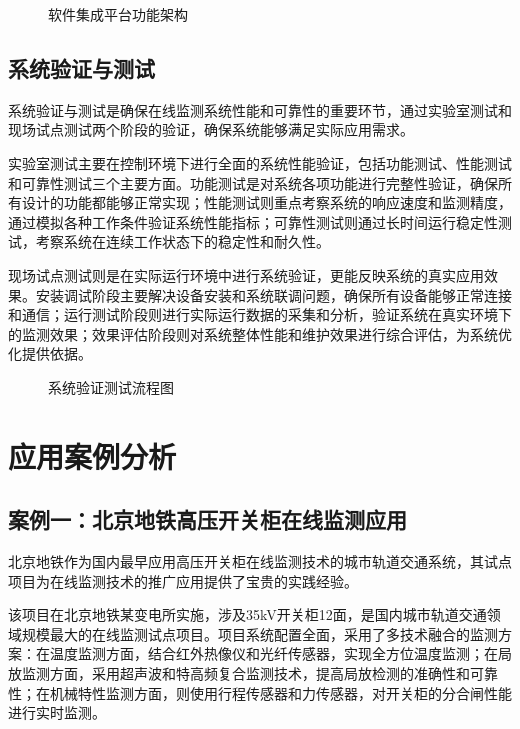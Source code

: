 \begin{figure}[h]
\centering
\caption{软件集成平台功能架构}
\label{fig:software_integration_platform}
\end{figure}

\subsection{系统验证与测试}

系统验证与测试是确保在线监测系统性能和可靠性的重要环节，通过实验室测试和现场试点测试两个阶段的验证，确保系统能够满足实际应用需求。

实验室测试主要在控制环境下进行全面的系统性能验证，包括功能测试、性能测试和可靠性测试三个主要方面。功能测试是对系统各项功能进行完整性验证，确保所有设计的功能都能够正常实现；性能测试则重点考察系统的响应速度和监测精度，通过模拟各种工作条件验证系统性能指标；可靠性测试则通过长时间运行稳定性测试，考察系统在连续工作状态下的稳定性和耐久性。

现场试点测试则是在实际运行环境中进行系统验证，更能反映系统的真实应用效果。安装调试阶段主要解决设备安装和系统联调问题，确保所有设备能够正常连接和通信；运行测试阶段则进行实际运行数据的采集和分析，验证系统在真实环境下的监测效果；效果评估阶段则对系统整体性能和维护效果进行综合评估，为系统优化提供依据。

\begin{figure}[h]
\centering
\caption{系统验证测试流程图}
\label{fig:system_testing_process}
\end{figure}

\section{应用案例分析}

\subsection{案例一：北京地铁高压开关柜在线监测应用}

北京地铁作为国内最早应用高压开关柜在线监测技术的城市轨道交通系统，其试点项目为在线监测技术的推广应用提供了宝贵的实践经验。

该项目在北京地铁某变电所实施，涉及35kV开关柜12面，是国内城市轨道交通领域规模最大的在线监测试点项目。项目系统配置全面，采用了多技术融合的监测方案：在温度监测方面，结合红外热像仪和光纤传感器，实现全方位温度监测；在局放监测方面，采用超声波和特高频复合监测技术，提高局放检测的准确性和可靠性；在机械特性监测方面，则使用行程传感器和力传感器，对开关柜的分合闸性能进行实时监测。

